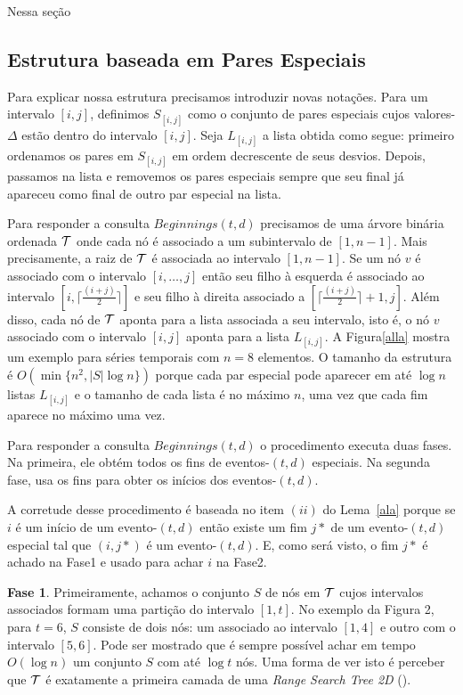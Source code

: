 \documentclass[12pt]{article}
\begin{document}
Nessa seção 

\subsection{Estrutura baseada em Pares Especiais}

Para explicar nossa estrutura precisamos introduzir novas notações.
Para um intervalo $[i, j]$, definimos $S_{[i,j]}$ como o conjunto
de pares especiais cujos valores-$\Delta$ estão dentro do intervalo $[i, j]$.
Seja $L_{[i, j]}$ a lista obtida como segue: primeiro ordenamos os pares
em $S_{[i, j]}$ em ordem decrescente de seus desvios. Depois, passamos na lista
e removemos os pares especiais sempre que seu final já apareceu como final de outro
par especial na lista.

Para responder a consulta $Beginnings(t,d)$ precisamos de uma árvore binária ordenada ${\cal T}$
onde cada nó é associado a um subintervalo de $[1, n - 1]$. Mais precisamente, a raiz de ${\cal T}$
é associada ao intervalo $[1, n - 1]$. Se um nó $v$ é associado com o intervalo $[i, \ldots, j]$ então
seu filho à esquerda é associado ao intervalo $[i, \lceil \frac{(i + j)}{2} \rceil]$ e seu filho à direita associado
a $[\lceil \frac{(i + j)}{2} \rceil  + 1, j]$. Além disso, cada nó de ${\cal T}$ aponta para a lista associada a seu intervalo, isto é, o nó $v$ associado com o intervalo $[i, j]$ aponta para a lista $L_{[i, j]}$. A Figura\ref{alla}
mostra um exemplo para séries temporais com $n = 8$ elementos. O tamanho da estrutura é $O(\min\{n^2, |S|\log n\})$ porque cada par especial pode aparecer em até $\log n$ listas $L_{[i, j]}$ e o tamanho de cada lista
é no máximo $n$, uma vez que cada fim aparece no máximo uma vez.

Para responder a consulta $Beginnings(t,d)$ o procedimento executa duas fases. Na primeira, 
ele obtém todos os fins de eventos-$(t,d)$ especiais. Na segunda fase, usa os fins para obter
os inícios dos eventos-$(t,d)$.

A corretude desse procedimento é baseada no item $(ii)$ do Lema~\ref{ala} porque se $i$ é um
início de um evento-$(t,d)$ então existe um fim $j*$ de um evento-$(t,d)$ especial tal que $(i, j*)$
é um evento-$(t,d)$. E, como será visto, o fim $j*$ é achado na Fase1 e usado para achar $i$ na Fase2.

\textbf{Fase 1}. Primeiramente, achamos o conjunto $S$ de nós em ${\cal T}$ cujos intervalos associados
formam uma partição do intervalo $[1, t]$. No exemplo da Figura 2, para $t = 6$, $S$ consiste de 
dois nós: um associado ao intervalo $[1, 4]$ e outro com o intervalo $[5, 6]$. Pode ser mostrado 
que é sempre possível achar em tempo $O(\log n)$ um conjunto $S$ com até $\log t$ nós. Uma forma
de ver isto é perceber que ${\cal T}$ é exatamente a primeira camada de uma \textit{Range Search Tree 2D}
(\cite{alla}).
\end{document}

